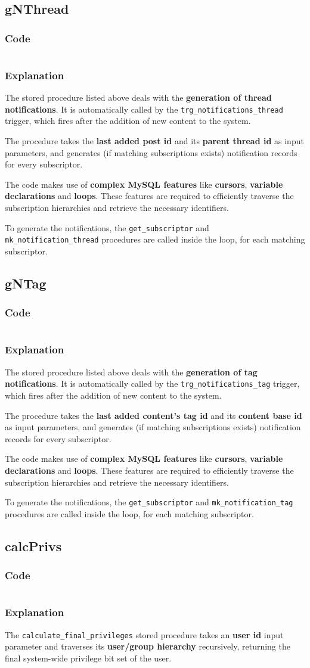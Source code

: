 \documentclass[12pt]{report}
\renewcommand\emph{\textbf}
\newcommand{\printSQLtest}[1]
{
    \inputminted[linenos, breaklines, breakbytoken, tabsize=4, fontsize=\footnotesize]{mysql}{#1}
}
\newcommand{\printSQLTablepage}[2]
{
    \newpage
    \subsection{#2}
    \subsubsection{Code}
    \printSQLtest{../sql/parts/#1}
    \subsubsection{Explanation}
}
\begin{document}
                \printSQLTablepage{26_procGNThread.sql}{gNThread}
                    The stored procedure listed above deals with the \emph{generation of thread notifications}. It is automatically called by the \texttt{trg_notifications_thread} trigger, which fires after the addition of new content to the system.

                    The procedure takes the \emph{last added post id} and its \emph{parent thread id} as input parameters, and generates (if matching subscriptions exists) notification records for every subscriptor.

                    The code makes use of \emph{complex MySQL features} like \emph{cursors}, \emph{variable declarations} and \emph{loops}.
                    These features are required to efficiently traverse the subscription hierarchies and retrieve the necessary identifiers.

                    To generate the notifications, the \texttt{get_subscriptor} and \texttt{mk_notification_thread} procedures are called inside the loop, for each matching subscriptor.


                \printSQLTablepage{27_procGNTag.sql}{gNTag}
                    The stored procedure listed above deals with the \emph{generation of tag notifications}. It is automatically called by the \texttt{trg_notifications_tag} trigger, which fires after the addition of new content to the system.

                    The procedure takes the \emph{last added content's tag id} and its \emph{content base id} as input parameters, and generates (if matching subscriptions exists) notification records for every subscriptor.

                    The code makes use of \emph{complex MySQL features} like \emph{cursors}, \emph{variable declarations} and \emph{loops}.
                    These features are required to efficiently traverse the subscription hierarchies and retrieve the necessary identifiers.

                    To generate the notifications, the \texttt{get_subscriptor} and \texttt{mk_notification_tag} procedures are called inside the loop, for each matching subscriptor.


                \printSQLTablepage{28_procCalcPrivs.sql}{calcPrivs}
                    The \texttt{calculate_final_privileges} stored procedure takes an \emph{user id} input parameter and traverses its \emph{user/group hierarchy} recursively, returning the final system-wide privilege bit set of the user.
\end{document}
